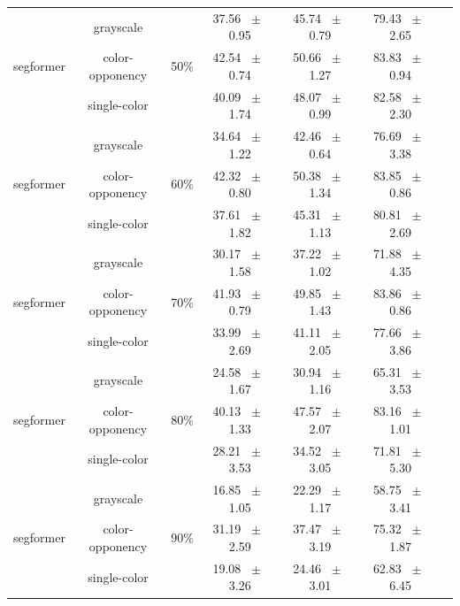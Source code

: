 \begin{table}[h]
\begin{tabular}{@{}lccc ccc@{}}
    \midrule
    \multirow{3}{*}{segformer} & grayscale & \multirow{3}{*}{50\%} & 37.56 ~$\pm$~ 0.95 & 45.74 ~$\pm$~ 0.79 & 79.43 ~$\pm$~ 2.65 \\
    & color-opponency &  & 42.54 ~$\pm$~ 0.74 & 50.66 ~$\pm$~ 1.27 & 83.83 ~$\pm$~ 0.94 \\
    & single-color &  & 40.09 ~$\pm$~ 1.74 & 48.07 ~$\pm$~ 0.99 & 82.58 ~$\pm$~ 2.30 \\
    \midrule
    \multirow{3}{*}{segformer} & grayscale & \multirow{3}{*}{60\%} & 34.64 ~$\pm$~ 1.22 & 42.46 ~$\pm$~ 0.64 & 76.69 ~$\pm$~ 3.38 \\
    & color-opponency &  & 42.32 ~$\pm$~ 0.80 & 50.38 ~$\pm$~ 1.34 & 83.85 ~$\pm$~ 0.86 \\
    & single-color &  & 37.61 ~$\pm$~ 1.82 & 45.31 ~$\pm$~ 1.13 & 80.81 ~$\pm$~ 2.69 \\
    \midrule
    \multirow{3}{*}{segformer} & grayscale & \multirow{3}{*}{70\%} & 30.17 ~$\pm$~ 1.58 & 37.22 ~$\pm$~ 1.02 & 71.88 ~$\pm$~ 4.35 \\
    & color-opponency &  & 41.93 ~$\pm$~ 0.79 & 49.85 ~$\pm$~ 1.43 & 83.86 ~$\pm$~ 0.86 \\
    & single-color &  & 33.99 ~$\pm$~ 2.69 & 41.11 ~$\pm$~ 2.05 & 77.66 ~$\pm$~ 3.86 \\
    \midrule
    \multirow{3}{*}{segformer} & grayscale & \multirow{3}{*}{80\%} & 24.58 ~$\pm$~ 1.67 & 30.94 ~$\pm$~ 1.16 & 65.31 ~$\pm$~ 3.53 \\
    & color-opponency &  & 40.13 ~$\pm$~ 1.33 & 47.57 ~$\pm$~ 2.07 & 83.16 ~$\pm$~ 1.01 \\
    & single-color &  & 28.21 ~$\pm$~ 3.53 & 34.52 ~$\pm$~ 3.05 & 71.81 ~$\pm$~ 5.30 \\
    \midrule
    \multirow{3}{*}{segformer} & grayscale & \multirow{3}{*}{90\%} & 16.85 ~$\pm$~ 1.05 & 22.29 ~$\pm$~ 1.17 & 58.75 ~$\pm$~ 3.41 \\
    & color-opponency &  & 31.19 ~$\pm$~ 2.59 & 37.47 ~$\pm$~ 3.19 & 75.32 ~$\pm$~ 1.87 \\
    & single-color &  & 19.08 ~$\pm$~ 3.26 & 24.46 ~$\pm$~ 3.01 & 62.83 ~$\pm$~ 6.45 \\
    \midrule
    \bottomrule
  \end{tabular}
  \label{tab:sparse_results_segformer_acdc_snow}
\end{table}